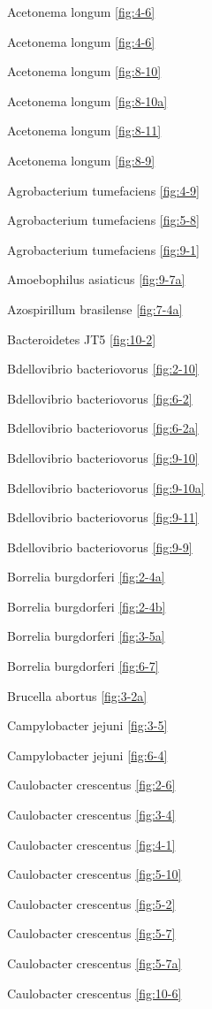 \documentclass[]{tufte-book}
\begin{document}
Acetonema longum \ref{fig:4-6}

Acetonema longum \ref{fig:4-6}

Acetonema longum \ref{fig:8-10}

Acetonema longum \ref{fig:8-10a}

Acetonema longum \ref{fig:8-11}

Acetonema longum \ref{fig:8-9}

Agrobacterium tumefaciens \ref{fig:4-9}

Agrobacterium tumefaciens \ref{fig:5-8}

Agrobacterium tumefaciens \ref{fig:9-1}

Amoebophilus asiaticus \ref{fig:9-7a}

Azospirillum brasilense \ref{fig:7-4a}

Bacteroidetes JT5 \ref{fig:10-2}

Bdellovibrio bacteriovorus \ref{fig:2-10}

Bdellovibrio bacteriovorus \ref{fig:6-2}

Bdellovibrio bacteriovorus \ref{fig:6-2a}

Bdellovibrio bacteriovorus \ref{fig:9-10}

Bdellovibrio bacteriovorus \ref{fig:9-10a}

Bdellovibrio bacteriovorus \ref{fig:9-11}

Bdellovibrio bacteriovorus \ref{fig:9-9}

Borrelia burgdorferi \ref{fig:2-4a}

Borrelia burgdorferi \ref{fig:2-4b}

Borrelia burgdorferi \ref{fig:3-5a}

Borrelia burgdorferi \ref{fig:6-7}

Brucella abortus \ref{fig:3-2a}

Campylobacter jejuni \ref{fig:3-5}

Campylobacter jejuni \ref{fig:6-4}

Caulobacter crescentus \ref{fig:2-6}

Caulobacter crescentus \ref{fig:3-4}

Caulobacter crescentus \ref{fig:4-1}

Caulobacter crescentus \ref{fig:5-10}

Caulobacter crescentus \ref{fig:5-2}

Caulobacter crescentus \ref{fig:5-7}

Caulobacter crescentus \ref{fig:5-7a}

Caulobacter crescentus \ref{fig:10-6}
\end{document}
